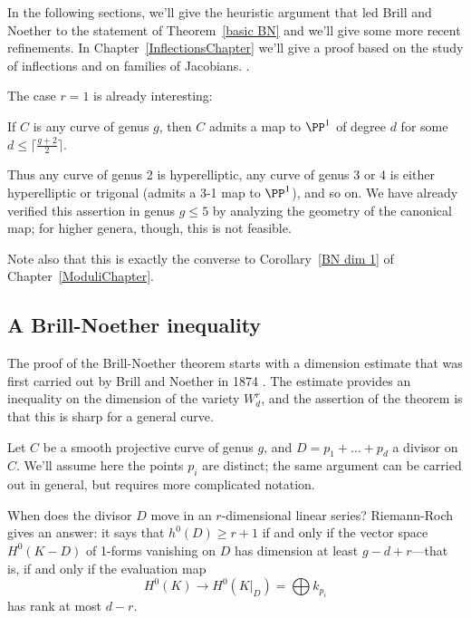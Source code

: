 In the following sections, we'll give the heuristic argument that led Brill and Noether to the statement of Theorem~\ref{basic BN} and we'll give some more recent refinements.   In Chapter~\ref{InflectionsChapter} we'll give a proof based on the study
of inflections and on families of Jacobians. .

The case $r=1$ is already interesting:

\begin{corollary}
If $C$ is any curve of genus $g$, then $C$ admits a map  to $\PP^1$ of degree $d$ for some $d \leq \lceil \frac{g+2}{2}\rceil$.
\end{corollary}

Thus any curve of genus 2 is hyperelliptic, any curve of genus 3 or 4 is either hyperelliptic or trigonal  (admits a 3-1 map to $\PP^1$), and so on. We have already verified this assertion in genus $g \leq 5$ by analyzing the geometry of the canonical map; for higher genera, though, this is not feasible.

Note also that this is exactly the converse to Corollary~\ref{BN dim 1} of Chapter~\ref{ModuliChapter}.


\subsection{A Brill-Noether inequality}

The proof of the Brill-Noether theorem starts with a dimension estimate that was first carried out by Brill and Noether in 1874 \cite{Brill-NoetherOriginal}. The estimate provides an inequality on the dimension
of the variety $W^r_d$, and the assertion of the theorem is that this is sharp for a general curve.


Let $C$ be a smooth projective curve of genus $g$, and $D = p_1 + \dots + p_d$ a divisor on $C$. We'll assume here the points $p_i$ are distinct; the same argument  can be carried out in general, but requires more complicated notation.

When does the divisor $D$ move in an $r$-dimensional linear series? Riemann-Roch gives an answer: it says that $h^0(D) \geq r+1$ if and only if the vector space $H^0(K-D)$ of 1-forms vanishing on $D$ has dimension at least $g-d+r$---that is, if and only if the  evaluation map
$$
H^0(K) \to H^0(K|_D) = \bigoplus k_{p_i}
$$
has rank at most $d-r$. 

